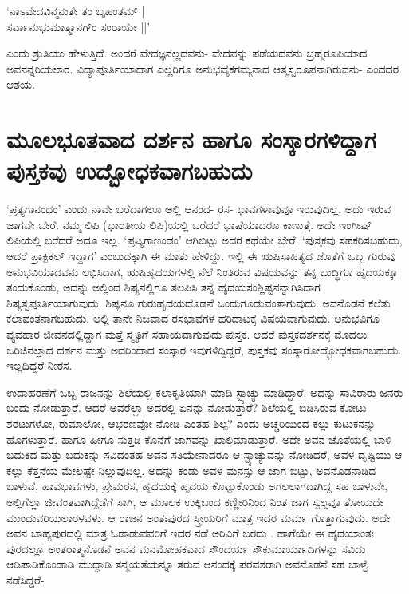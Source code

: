 \begin{shloka}
`ನಾಽವೇದವಿನ್ಮನುತೇ ತಂ ಬೃಹಂತಮ್ |\label{106}\\
ಸರ್ವಾನುಭುಮಾತ್ಮಾನಗ್ಂ ಸಂರಾಯೇ ||'
\end{shloka}
ಎಂದು ಶ್ರುತಿಯು ಹೇಳುತ್ತಿದೆ. ಅಂದರೆ ವೇದಜ್ಞನಲ್ಲದವನು- ವೇದವನ್ನು ಪಡೆಯದವನು ಬ್ರಹ್ಮರೂಪಿಯಾದ ಅವನನ್ನರಿಯಲಾರ. ವಿದ್ಯಾಪೂರ್ತಿಯಾದಾಗ ಎಲ್ಲರಿಗೂ ಅನುಭವೈಕಗಮ್ಯನಾದ ಆತ್ಮಸ್ವರೂಪನಾಗಿರುವನು- ಎಂದದರ ಆಶಯ.

\section*{ಮೂಲಭೂತವಾದ ದರ್ಶನ ಹಾಗೂ ಸಂಸ್ಕಾರಗಳಿದ್ದಾಗ ಪುಸ್ತಕವು ಉದ್ಬೋಧಕವಾಗಬಹುದು}

`ಪ್ರತ್ಯಗಾನಂದಂ' ಎಂದು ನಾವೇ ಬರೆದಾಗಲೂ ಅಲ್ಲಿ ಆನಂದ- ರಸ- ಭಾವಗಳಾವುವೂ ಇರುವುದಿಲ್ಲ. ಅದು ಇರುವ ಜಾಗವೇ ಬೇರೆ. ನಮ್ಮ ಲಿಪಿ (ಭಾರತೀಯ ಲಿಪಿ)ಯಲ್ಲಿ ಬರೆದರೆ ಭಾಷೆಯಾದರೂ ಕಾಣುತ್ತೆ. ಅದೇ ಇಂಗೀಷ್ ಲಿಪಿಯಲ್ಲಿ ಬರೆದರೆ ಅದೂ ಇಲ್ಲ. `ಪ್ರಟ್ಯಗಾಣಂಡಂ' ಆಗಿಬಿಟ್ಟು  ಅದರ ಕಥೆಯೇ ಬೇರೆ. `ಪುಸ್ತಕವು ಸಹಕರಿಸಬಹುದು, ಆದರೆ ಪ್ರಾಕ್ಟಿಕಲ್ ಇದ್ದಾಗ' ಎಂಬುದಕ್ಕಾಗಿ ಈ ಮಾತು ಹೇಳಿದ್ದು. ಇಲ್ಲಿ ಈ ಋಷಿಸಾಹಿತ್ಯದ ಜೊತೆಗೆ ಒಬ್ಬ ಗುರುವು ಅನುಭವಿಯಾದವನು ಲಭಿಸಿದಾಗ, ಋಷಿಹೃದಯಗಳಲ್ಲಿ ನೆಲೆ ನಿಂತಿರುವ ವಿಷಯವನ್ನು ತನ್ನ ಬುದ್ಧಿಗೂ ಹೃದಯಕ್ಕೂ ತಂದುಕೊಂಡು, ಅದನ್ನು ಅಲ್ಲಿಂದ ಶಿಷ್ಯನಲ್ಲಿಗೂ ತಲಪಿಸಿ ತನ್ನ ಹೃದಯಸಂಶ್ಲಿಷ್ಟನನ್ನಾಗಿಸಿದಾಗ ಶಿಷ್ಯತ್ವಪೂರ್ತಿಯಾಗುವುದು. ಶಿಷ್ಯನೂ ಗುರುಹೃದಯದೊಡನೆ ಒಂದುಗೂಡುವಂತಾಗುವುದು. ಅವನೊಡನೆ ಕಲೆತು ಕಲಾವಂತನಾಗಬಹುದು. ಅಲ್ಲಿ ತಾನೇ ನಿಜವಾದ ರಸಭಾವಗಳ ಹರಿದಾಟಕ್ಕೆ ವಿಷಯವಾಗುವುದು. ಅನುಭವಿಗೂ ವ್ಯವಹಾರ ಜೀವನದಲ್ಲಿದ್ದಾಗ ಮತ್ತೆ ಸ್ಮೃತಿಗೆ ಸಹಾಯವಾಗುವುದು ಪುಸ್ತಕ. ಆದರೆ ಪುಸ್ತಕದರ್ಶನಕ್ಕೆ ಮೊದಲು ಒರಿಜಿನಲ್ಲಾದ ದರ್ಶನ ಮತ್ತು ಅದರಿಂದಾದ ಸಂಸ್ಕಾರ ಇವುಗಳಿದ್ದಿದ್ದರೆ, ಪುಸ್ತಕವು ಸಂಸ್ಕಾರೋದ್ಭೋಧಕವಾಗಬಹುದು. ಇಲ್ಲದಿದ್ದರೆ ನೀರಸ.

ಉದಾಹರಣೆಗೆ ಒಬ್ಬ ರಾಜನನ್ನು ಶಿಲೆಯಲ್ಲಿ ಕಲಾಕೃತಿಯಾಗಿ ಮಾಡಿ ಸ್ಟ್ಯಾಚ್ಯು ಮಾಡಿದ್ದಾರೆ. ಅದನ್ನು ಸಾವಿರಾರು ಜನರು ಬಂದು ನೋಡುತ್ತಾರೆ. ಆದರೆ ಅವರೆಲ್ಲಾ ಅದರಲ್ಲಿ ಏನನ್ನು ನೋಡುತ್ತಾರೆ? ಶಿಲೆಯಲ್ಲಿ ಬಿಡಿಸಿರುವ ಕೋಟು ಶರಟುಗಳೋ, ರುಮಾಲೋ, ಆಭರಣವೋ ನೋಡಿ ಎಂತಹ ಶಿಲ್ಪ? ಎಂದು ಅಚ್ಚರಿಯಿಂದ ಕಲ್ಲು ಕುಟುಕನನ್ನು ಹೊಗಳುತ್ತಾರೆ. ಹಾಗೂ ಹೀಗೂ ಸುತ್ತಡಿ ಕೊನೆಗೆ ಜಾಗವನ್ನು ಖಾಲಿಮಾಡುತ್ತಾರೆ. ಅದೇ ಅವನ ಜೊತೆಯಲ್ಲಿ ಬಾಳಿ ಬದುಕಿದ ಮತ್ತು ಬದುಕನ್ನು ಸವಿದಂತಹ ಅವನ ಸತಿಯೇನಾದರೂ ಆ ಸ್ಟ್ಯಾಚ್ಯುವನ್ನು ನೋಡಿದರೆ, ಅವಳ ದೃಷ್ಟಿಯು ಆ ಕಲ್ಲು ಕೆತ್ತನೆಯ ಮೇಲಷ್ಟೇ ನಿಲ್ಲುವುದಿಲ್ಲ. ಅದನ್ನು ಕಂಡು ಅವಳ ಮನಸ್ಸು ಆ ಜಾಗ ಬಿಟ್ಟು, ಅವನೊಡನಾಡಿದ ಬಾಳುವೆ, ಹಾವಭಾವಗಳು, ಪ್ರೇಮರಸ, ಹೃದಯಕ್ಕೆ ಹೃದಯ ಕೊಟ್ಟುಕೊಂಡು ಅಗಲಲಾಗದಾಗಿದ್ದ ಸಹ ಬಾಳುವೇ, ಅಲ್ಲಿಗೆಲ್ಲಾ ಜೀವಂತವಾಗಿದ್ದೆಡೆಗೆ ಸಾಗಿ, ಆ ಮೂಲಕ ಉಕ್ಕಿಬಂದ ಕಣ್ಣೀರಿನಿಂದ ನಿಂತ ಜಾಗ ಸ್ವಲ್ಪವೂ ತೋಯದೇ ಮುಂದುವರಿಯಲಾರಳವಳು. ಆ ರಾಜನ ಅಂತಃಪುರದ ಸ್ತ್ರೀಯರಿಗೆ ಮಾತ್ರ ಇದರ ಮರ್ಮ ಗೊತ್ತಾಗುವುದು. ಅದೇ ಅವನ ಬಾಹ್ಯಪುರದಲ್ಲಿ ಮಾತ್ರ ಓಡಾಡುವವರಿಗೆ ಇದರ ನಡೆ ಅರಿವಿಗೆ ಬರದು . ಹಾಗೆಯೇ ಈ ಹೃದಯಾಂತಃ ಪುರದಲ್ಲೂ ಅಂತರಾತ್ಮನೊಡನೆ ಅವನ ಮನಮೋಹಕವಾದ ಸೌಂದರ್ಯ ಸೌಕುಮಾರ್ಯಾದಿಗಳನ್ನು ಸವಿದು ಆಡಿಪಾಡಿಕೊಂಡಾಡಿ ಮುದ್ದಾಡಿ ತನ್ಮಯತೆಯನ್ನೂ ತರುವ ಆನಂದಕ್ಕೆ ಪರವಶರಾಗಿ ಅವನೊಡನೆ ಸಹ ಬಾಳ್ವೆ ನಡೆಸಿದ್ದರೆ-

